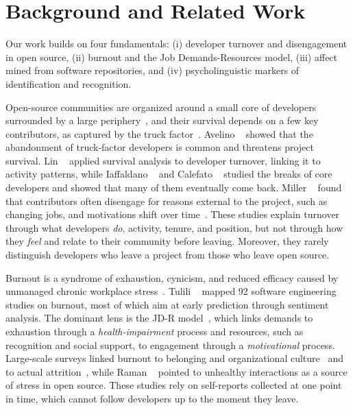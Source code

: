 \section{Background and Related Work}
\label{sec:rw}

Our work builds on four fundamentals: (i) developer turnover and disengagement in open source, (ii) burnout and the Job Demands-Resources model, (iii) affect mined from software repositories, and (iv) psycholinguistic markers of identification and recognition.
\begin{description}[leftmargin=0.3cm]
\item[Turnover and Disengagement in Open Source]
Open-source communities are organized around a small core of developers surrounded by a large periphery~\cite{joblin2017classifying,joblin2015developer}, and their survival depends on a few key contributors, as captured by the truck factor~\cite{avelino2016novel}. Avelino \etal~\cite{avelino2019abandonment} showed that the abandonment of truck-factor developers is common and threatens project survival. Lin \etal~\cite{lin2017developer} applied survival analysis to developer turnover, linking it to activity patterns, while Iaffaldano \etal~\cite{iaffaldano2019why} and Calefato \etal~\cite{calefato2022will} studied the breaks of core developers and showed that many of them eventually come back. Miller \etal~\cite{miller2019people} found that contributors often disengage for reasons external to the project, such as changing jobs, and motivations shift over time~\cite{gerosa2021shifting}. These studies explain turnover through what developers \textit{do}, \ie activity, tenure, and position, but not through how they \textit{feel} and relate to their community before leaving. Moreover, they rarely distinguish developers who leave a project from those who leave open source.

\item[Burnout and the Job Demands-Resources Model]
Burnout is a syndrome of exhaustion, cynicism, and reduced efficacy caused by unmanaged chronic workplace stress~\cite{maslach2016burnout}. Tulili \etal~\cite{tulili2023burnout} mapped 92 software engineering studies on burnout, most of which aim at early prediction through sentiment analysis. The dominant lens is the JD-R model~\cite{demerouti2001job,bakker2007job}, which links demands to exhaustion through a \textit{health-impairment} process and resources, such as recognition and social support, to engagement through a \textit{motivational} process. Large-scale surveys linked burnout to belonging and organizational culture~\cite{trinkenreich2023model} and to actual attrition~\cite{trinkenreich2024attrition}, while Raman \etal~\cite{raman2020stress} pointed to unhealthy interactions as a source of stress in open source. These studies rely on self-reports collected at one point in time, which cannot follow developers up to the moment they leave.


\end{description}
